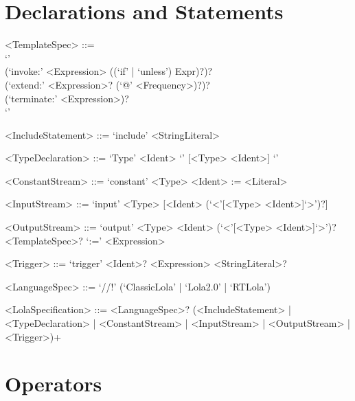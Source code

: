 \documentclass{scrartcl}
\begin{document}
    
  \section{Declarations and Statements}
  
  \begin{grammar}
  
  <TemplateSpec> ::= \ \\
      `{' \\
        (`invoke:' <Expression> ((`if' | `unless') Expr)?)? \\
        (`extend:' <Expression>? (`@' <Frequency>)?)? \\
        (`terminate:' <Expression>)? \\
      `}'
      
  <IncludeStatement> ::= `include' <StringLiteral>
  
  <TypeDeclaration> ::= `Type' <Ident> `{' [<Type> <Ident>] `}'
  
  <ConstantStream> ::= `constant' <Type> <Ident> := <Literal>
  
  <InputStream> ::= `input' <Type> [<Ident> (`<'[<Type> <Ident>]`>')?]
  
  <OutputStream> ::= `output' <Type> <Ident> (`<'[<Type> <Ident>]`>')? <TemplateSpec>? `:=' <Expression>
  
  <Trigger> ::= `trigger' <Ident>? <Expression> <StringLiteral>?
  
  <LanguageSpec> ::= `//!' (`ClassicLola' | `Lola2.0' | `RTLola')
  
  <LolaSpecification> ::= <LanguageSpec>? (<IncludeStatement> | <TypeDeclaration> | <ConstantStream> | <InputStream> | <OutputStream> | <Trigger>)+
    
  \end{grammar}

  \section{Operators}
  
  \setcounter{prec}{1}
  
\end{document}
